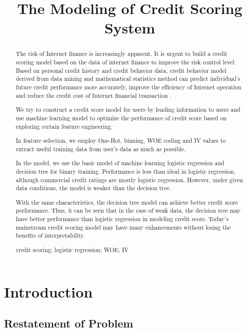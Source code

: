 \documentclass{mcmthesis}
\title{The Modeling of Credit Scoring System }
\begin{document}
\begin{abstract}
  
The risk of Internet finance is increasingly apparent. 
It is urgent to build a credit scoring model based on the data of internet finance to improve the risk control level. Based on personal credit history and credit behavior data, credit behavior model derived from data mining and mathematical statistics method can predict individual's future credit performance more accurately, improve the efficiency of Internet operation and reduce the credit cost of Internet financial transaction .
 
We try to construct a credit score model for users by lending information to users and use machine learning model to optimize the performance of credit score based on exploring certain feature engineering.

In feature selection, we employ One-Hot, binning, WOE coding and IV values ​​to extract useful training data from user's data as much as possible.

In the model, we use the basic model of machine learning logistic regression and decision tree for binary training. Performance is less than ideal in logistic regression, although commercial credit ratings are mostly logistic regression. However, under given data conditions, the model is weaker than the decision tree.

With the same characteristics, the decision tree model can achieve better credit score performance. Thus, it can be seen that in the case of weak data, the decision tree may have better performance than logistic regression in modeling credit score. Today's mainstream credit scoring model may have many enhancements without losing the benefits of interpretability.
\begin{keywords}
credit scoring; logistic regression; WOE; IV
\end{keywords}
\end{abstract}
\maketitle
\tableofcontents
\newpage
\section{Introduction}
\subsection{Restatement of Problem}
\end{document}
